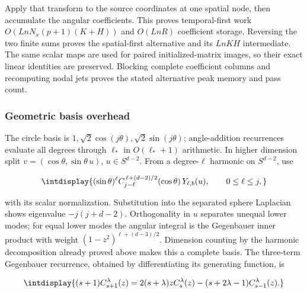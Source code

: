 
Apply that transform to the source coordinates at one spatial node, then accumulate the angular coefficients. This proves temporal-first work \(O(LnN_x(p+1)(K+H))\) and \(O(LnR)\) coefficient storage. Reversing the two finite sums proves the spatial-first alternative and its \(LnKH\) intermediate. The same scalar maps are used for paired initialized-matrix images, so their exact linear identities are preserved. Blocking complete coefficient columns and recomputing nodal jets proves the stated alternative peak memory and pass count.


\subsubsection{Geometric basis overhead}



The circle basis is \(1,\allowbreak \sqrt2\cos(j\theta),\allowbreak \sqrt2\sin(j\theta)\); angle-addition recurrences evaluate all degrees through \(\ell_*\) in \(O(\ell_*+1)\) arithmetic. In higher dimension split \(v=(\cos\theta,\allowbreak \sin\theta\,\allowbreak u)\), \(u\in S^{d-2}\). From a degree-\(\ell\) harmonic on \(S^{d-2}\), use


\begingroup\renewcommand{\theHequation}{intdisplay.834}
\begin{equation}
\intdisplay{
(\sin\theta)^\ell
C_{j-\ell}^{\,\ell+(d-2)/2}(\cos\theta)\,Y_{\ell,b}(u),
\qquad 0\le\ell\le j,
}
\label{int:eq-0409-cost-separated-harmonics}
\end{equation}
\endgroup


with its scalar normalization. Substitution into the separated sphere Laplacian shows eigenvalue \(-j(j+d-2)\). Orthogonality in \(u\) separates unequal lower modes; for equal lower modes the angular integral is the Gegenbauer inner product with weight \((1-z^2)^{\ell+(d-3)/2}\). Dimension counting by the harmonic decomposition already proved above makes this a complete basis. The three-term Gegenbauer recurrence, obtained by differentiating its generating function, is


\begingroup\renewcommand{\theHequation}{intdisplay.835}
\begin{equation*}
\intdisplay{
(s+1)C_{s+1}^{\lambda}(z)
 =2(s+\lambda)zC_s^\lambda(z)
  -(s+2\lambda-1)C_{s-1}^\lambda(z).
}
\end{equation*}
\endgroup

